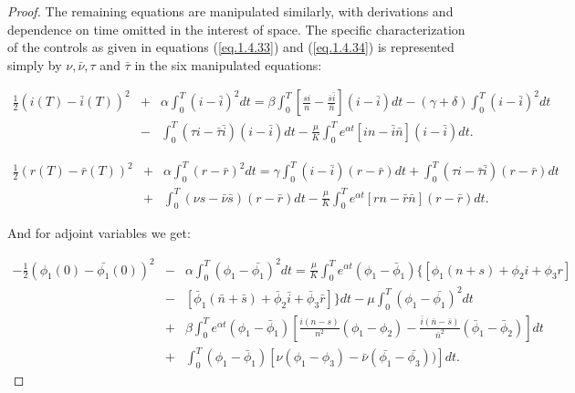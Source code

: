 \begin{proof}
The remaining equations are manipulated similarly, with derivations and dependence on time omitted in the interest of space. The specific characterization of the controls as given in equations (\ref{eq.1.4.33}) and (\ref{eq.1.4.34}) is represented simply by $\nu,\bar{\nu},\tau$ and $\bar{\tau}$ in the six manipulated equations:

\begin{eqnarray}
\frac{1}{2}(i(T)-\bar{i}(T))^2&+&\alpha\int_{0}^{T}(i-\bar{i})^2dt=\beta\int_{0}^{T}\left[\frac{si}{n}-\frac{\bar{s}\bar{i}}{\bar{n}}\right](i-\bar{i})dt-(\gamma+\delta)\int_{0}^{T}(i-\bar{i})^2dt\nonumber\\
&-&\int_{0}^{T}(\tau i-\bar{\tau}\bar{i})(i-\bar{i})dt-\frac{\mu}{K}\int_{0}^{T} e^{\alpha t}\left[in-\bar{i}\bar{n}\right](i-\bar{i})dt. \label{eq.1.4.36}
\end{eqnarray}

\begin{eqnarray}
\frac{1}{2}(r(T)-\bar{r}(T))^2&+&\alpha\int_{0}^{T}(r-\bar{r})^2dt=\gamma\int_{0}^{T}(i-\bar{i})(r-\bar{r})dt+\int_{0}^{T}(\tau i-\bar{\tau}\bar{i})(r-\bar{r})dt\nonumber\\
&+&\int_{0}^{T}(\nu s-\bar{\nu}\bar{s})(r-\bar{r})dt-\frac{\mu}{K}\int_{0}^{T} e^{\alpha t}\left[rn-\bar{r}\bar{n}\right](r-\bar{r})dt. \label{eq.1.4.37}
\end{eqnarray}

And for adjoint variables we get:

\begin{eqnarray}
-\frac{1}{2}(\phi_1(0)-\bar{\phi_1}(0))^2&-&\alpha\int_{0}^{T}(\phi_1-\bar{\phi_1})^2dt=\frac{\mu}{K}\int_{0}^{T}e^{\alpha t}(\phi_1-\bar{\phi}_1)\{[\phi_1(n+s)+\phi_2 i +\phi_3 r]\nonumber\\
&-&[\bar{\phi}_1(\bar{n}+\bar{s})+\bar{\phi}_2 \bar{i} +\bar{\phi}_3 \bar{r}]\}dt-\mu\int_{0}^{T}(\phi_1-\bar{\phi_1})^2dt \nonumber\\
&+&\beta\int_{0}^{T}e^{\alpha t}(\phi_1-\bar{\phi}_1)\left[\frac{i(n-s)}{n^2}(\phi_1-\phi_2)-\frac{\bar{i}(\bar{n}-\bar{s})}{\bar{n}^2}(\bar{\phi}_1-\bar{\phi}_2)\right]dt \nonumber\\
&+&\int_{0}^{T} (\phi_1-\bar{\phi}_1)[\nu(\phi_1-\phi_3)-\bar{\nu}(\bar{\phi_1}-\bar{\phi_3}))]dt. \label{eq.1.4.38}
\end{eqnarray}


\end{proof}
